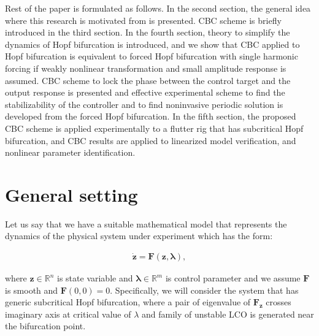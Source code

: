 \documentclass[openacc]{rsproca_new}%
\theoremstyle{own}
\def\real{\mathbb{R}}
\def\vec#1{\ensuremath{\mathbf{#1}}}
\begin{document}
Rest of the paper is formulated as follows. In the second section, the general idea where this research is motivated from is presented. CBC scheme is briefly introduced in the third section. In the fourth section, theory to simplify the dynamics of Hopf bifurcation is introduced, and we show that CBC applied to Hopf bifurcation is equivalent to forced Hopf bifurcation with single harmonic forcing if weakly nonlinear transformation and small amplitude response is assumed. CBC scheme to lock the phase between the control target and the output response is presented and effective experimental scheme to find the stabilizability of the controller and to find noninvasive periodic solution is developed from the forced Hopf bifurcation. In the fifth section, the proposed CBC scheme is applied experimentally to a flutter rig that has subcritical Hopf bifurcation, and CBC results are applied to linearized model verification, and nonlinear parameter identification.

\section{General setting}\label{GS}
Let us say that we have a suitable mathematical model that represents the dynamics of the physical system under experiment which has the form:

\begin{align}\label{eq:gs}
  \dot{\vec{z}} =\vec{F}(\vec{z},\vec{\lambda}),
\end{align}

\noindent where \(\vec{z}\in \real^n\) is state variable and \(\vec{\lambda}\in\real^m\) is control parameter and we assume $\vec{F}$ is smooth and \(\vec{F}(0,0)=0\). Specifically, we will consider the system that has generic subcritical Hopf bifurcation, where a pair of eigenvalue of $\vec{F}_\vec{z}$ crosses imaginary axis at critical value of $\lambda$ and family of unstable LCO is generated near the bifurcation point.
\end{document}
